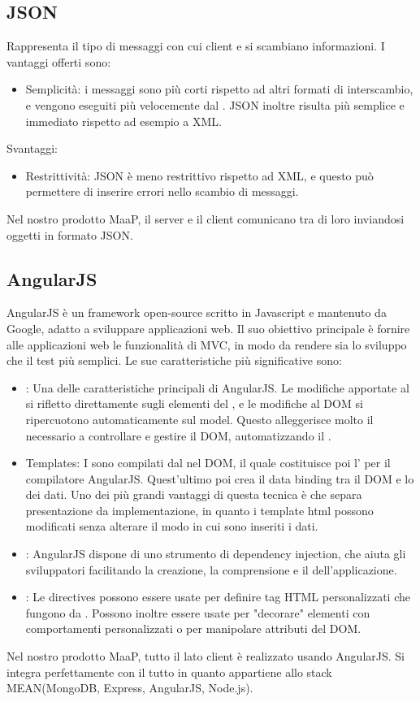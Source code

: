 \subsection{JSON}
Rappresenta il tipo di messaggi con cui client e  si scambiano informazioni. I vantaggi offerti sono:
\begin{itemize}
\item Semplicità: i messaggi  sono più corti rispetto ad altri formati di interscambio, e vengono eseguiti più velocemente dal . JSON inoltre risulta più semplice e immediato rispetto ad esempio a XML.
\end{itemize}
Svantaggi:
\begin{itemize}
\item Restrittività: JSON è meno restrittivo rispetto ad XML, e questo può permettere di inserire errori nello scambio di messaggi.
\end{itemize}
Nel nostro prodotto MaaP, il server e il client comunicano tra di loro inviandosi oggetti in formato JSON.

\subsection{AngularJS}
AngularJS è un framework open-source scritto in Javascript e mantenuto da Google, adatto a sviluppare applicazioni web. Il suo obiettivo principale è fornire alle applicazioni web le funzionalità di MVC, in modo da rendere sia lo sviluppo che il test più semplici.
Le sue caratteristiche più significative sono:
\begin{itemize}
\item {}: Una delle caratteristiche principali di AngularJS. Le modifiche apportate al  si rifletto direttamente sugli elementi del , e le modifiche al DOM si ripercuotono automaticamente sul model. Questo alleggerisce molto il  necessario a controllare e gestire il DOM, automatizzando il .
\item Templates: I   sono compilati dal  nel DOM, il quale costituisce poi l' per il compilatore AngularJS. Quest'ultimo poi crea il data binding tra il DOM e lo  dei dati. Uno dei più grandi vantaggi di questa tecnica è che separa presentazione da implementazione, in quanto i template html possono modificati senza alterare il modo in cui sono inseriti i dati.
\item {}: AngularJS dispone di uno strumento di dependency injection, che aiuta gli sviluppatori facilitando la creazione, la comprensione e il  dell'applicazione.
\item {}: Le directives possono essere usate per definire tag HTML personalizzati che fungono da . Possono inoltre essere usate per "decorare" elementi con comportamenti personalizzati o per manipolare attributi del DOM.
\end{itemize}
Nel nostro prodotto MaaP, tutto il lato client è realizzato usando AngularJS. Si integra perfettamente con il tutto in quanto appartiene allo stack MEAN(MongoDB, Express, AngularJS, Node.js).

